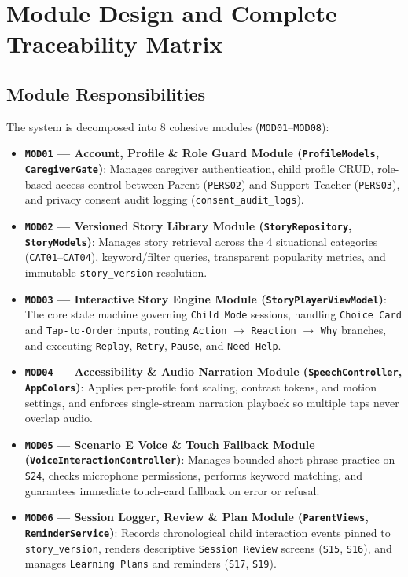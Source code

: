 \section{Module Design and Complete Traceability Matrix}



\subsection{Module Responsibilities}


The system is decomposed into 8 cohesive modules (\texttt{MOD01}–\texttt{MOD08}):

\begin{itemize}
  \item \textbf{\texttt{MOD01} — Account, Profile \& Role Guard Module (\texttt{ProfileModels}, \texttt{CaregiverGate})}: Manages caregiver authentication, child profile CRUD, role-based access control between Parent (\texttt{PERS02}) and Support Teacher (\texttt{PERS03}), and privacy consent audit logging (\texttt{consent\_audit\_logs}).
  \item \textbf{\texttt{MOD02} — Versioned Story Library Module (\texttt{StoryRepository}, \texttt{StoryModels})}: Manages story retrieval across the 4 situational categories (\texttt{CAT01}–\texttt{CAT04}), keyword/filter queries, transparent popularity metrics, and immutable \texttt{story\_version} resolution.
  \item \textbf{\texttt{MOD03} — Interactive Story Engine Module (\texttt{StoryPlayerViewModel})}: The core state machine governing \texttt{Child Mode} sessions, handling \texttt{Choice Card} and \texttt{Tap-to-Order} inputs, routing \texttt{Action} $\rightarrow$ \texttt{Reaction} $\rightarrow$ \texttt{Why} branches, and executing \texttt{Replay}, \texttt{Retry}, \texttt{Pause}, and \texttt{Need Help}.
  \item \textbf{\texttt{MOD04} — Accessibility \& Audio Narration Module (\texttt{SpeechController}, \texttt{AppColors})}: Applies per-profile font scaling, contrast tokens, and motion settings, and enforces single-stream narration playback so multiple taps never overlap audio.
  \item \textbf{\texttt{MOD05} — Scenario E Voice \& Touch Fallback Module (\texttt{VoiceInteractionController})}: Manages bounded short-phrase practice on \texttt{S24}, checks microphone permissions, performs keyword matching, and guarantees immediate touch-card fallback on error or refusal.
  \item \textbf{\texttt{MOD06} — Session Logger, Review \& Plan Module (\texttt{ParentViews}, \texttt{ReminderService})}: Records chronological child interaction events pinned to \texttt{story\_version}, renders descriptive \texttt{Session Review} screens (\texttt{S15}, \texttt{S16}), and manages \texttt{Learning Plans} and reminders (\texttt{S17}, \texttt{S19}).

\end{itemize}
